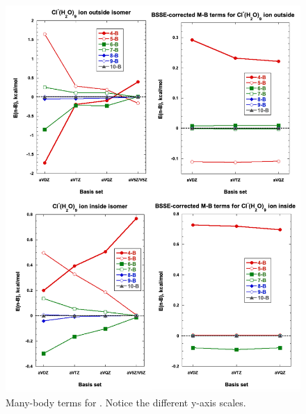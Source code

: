 \begin{figure}[t]
    \centering
    \begin{adjustbox}{max size={.6\textwidth}{.6\textheight}}
    \includegraphics[width=\textwidth]{Figures/Chapter_3/figure_8_combined.png}
    \end{adjustbox}
\begin{spacing}{1.0}
  \caption[Many-body terms for .]{Many-body terms for . Notice the different y-axis scales.}\label{fig:MBE_II_8}
  \end{spacing}
\end{figure}